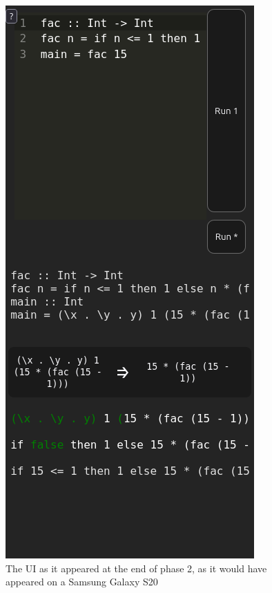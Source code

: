 \begin{figure}[h]
    \centering
    \includegraphics[width=0.3\linewidth]{images/testathon-mobile.png}
    \caption{The UI as it appeared at the end of phase 2, as it would have appeared on a Samsung Galaxy S20}
    \label{fig:screenshot_phase2_mobile}
\end{figure}


